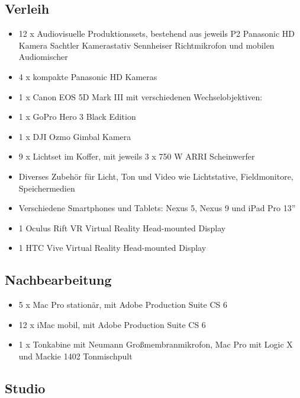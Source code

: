 \subsection{Verleih\label{/mi-2017/selbstbericht/0800-ausstattung/0000-ausstattung}}\label{verleihpathlabelmi-2017selbstbericht0800-ausstattung0000-ausstattung}

\begin{itemize}
\tightlist
\item
  12 x Audiovisuelle Produktionssets, bestehend aus jeweils P2 Panasonic
  HD Kamera Sachtler Kamerastativ Sennheiser Richtmikrofon und mobilen
  Audiomischer
\item
  4 x kompakte Panasonic HD Kameras
\item
  1 x Canon EOS 5D Mark III mit verschiedenen Wechselobjektiven:
\item
  1 x GoPro Hero 3 Black Edition
\item
  1 x DJI Ozmo Gimbal Kamera
\item
  9 x Lichtset im Koffer, mit jeweils 3 x 750 W ARRI Scheinwerfer
\item
  Diverses Zubehör für Licht, Ton und Video wie Lichtstative,
  Fieldmonitore, Speichermedien
\item
  Verschiedene Smartphones und Tablets: Nexus 5, Nexus 9 und iPad Pro
  13''
\item
  1 Oculus Rift VR Virtual Reality Head-mounted Display
\item
  1 HTC Vive Virtual Reality Head-mounted Display
\end{itemize}

\subsection{Nachbearbeitung\label{/mi-2017/selbstbericht/0800-ausstattung/0000-ausstattung}}\label{nachbearbeitungpathlabelmi-2017selbstbericht0800-ausstattung0000-ausstattung}

\begin{itemize}
\tightlist
\item
  5 x Mac Pro stationär, mit Adobe Production Suite CS 6
\item
  12 x iMac mobil, mit Adobe Production Suite CS 6
\item
  1 x Tonkabine mit Neumann Großmembranmikrofon, Mac Pro mit Logic X und
  Mackie 1402 Tonmischpult
\end{itemize}

\subsection{Studio\label{/mi-2017/selbstbericht/0800-ausstattung/0000-ausstattung}}\label{studiopathlabelmi-2017selbstbericht0800-ausstattung0000-ausstattung}

